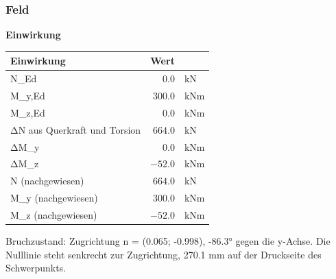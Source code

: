 \documentclass[11pt,a4paper]{article}
\begin{document}
\subsubsection{Feld}
\noindent\textbf{Einwirkung}
\begin{longtable}{lrl}
\hline
Einwirkung & Wert &  \\
\hline
\endhead
N\_Ed & $0.0$ & kN \\
M\_y,Ed & $300.0$ & kNm \\
M\_z,Ed & $0.0$ & kNm \\
ΔN aus Querkraft und Torsion & $664.0$ & kN \\
ΔM\_y & $0.0$ & kNm \\
ΔM\_z & $-52.0$ & kNm \\
N (nachgewiesen) & $664.0$ & kN \\
M\_y (nachgewiesen) & $300.0$ & kNm \\
M\_z (nachgewiesen) & $-52.0$ & kNm \\
\hline
\end{longtable}
Bruchzustand: Zugrichtung n = (0.065; -0.998), -86.3° gegen die y-Achse. Die Nulllinie steht senkrecht zur Zugrichtung, 270.1 mm auf der Druckseite des Schwerpunkts.
\end{document}
